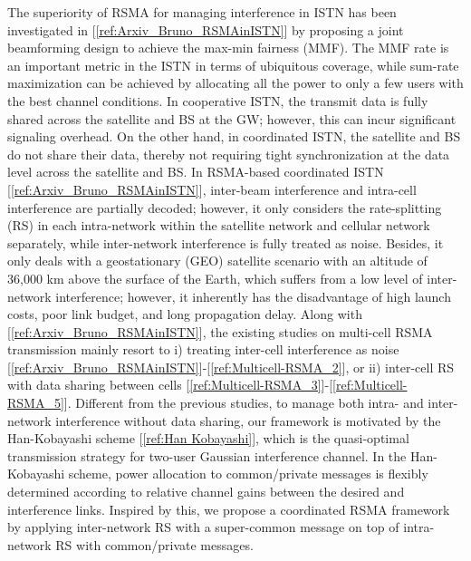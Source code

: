 \documentclass[draftclsnofoot, onecolumn, comsoc, 12pt]{IEEEtran}
\begin{document}
The superiority of RSMA for managing interference in ISTN has been investigated in [\ref{ref:Arxiv_Bruno_RSMAinISTN}] by proposing a joint beamforming design to achieve the max-min fairness (MMF).
The MMF rate is an important metric in the ISTN in terms of ubiquitous coverage, while sum-rate maximization can be achieved by allocating all the power to only a few users with the best channel conditions.
{In cooperative ISTN, the transmit data is fully shared across the satellite and BS at the GW; however, this can incur significant signaling overhead. 
On the other hand, in coordinated ISTN, the satellite and BS do not share their data, thereby not requiring tight synchronization at the data level across the satellite and BS.} 
In RSMA-based coordinated ISTN  \mbox{[\ref{ref:Arxiv_Bruno_RSMAinISTN}]}, inter-beam interference and intra-cell interference are partially decoded; 
however, it only considers the rate-splitting (RS) in each intra-network within the satellite network and cellular network separately, while inter-network interference is fully treated as noise. 
{Besides, it only deals with a geostationary (GEO) satellite scenario with an altitude of 36,000 km above the surface of the Earth, which suffers from a low level of inter-network interference; however, it inherently has the disadvantage of high launch costs, poor link budget, and long propagation delay.} 
Along with \mbox{[\ref{ref:Arxiv_Bruno_RSMAinISTN}]}, the existing studies on multi-cell RSMA transmission mainly resort to i) treating inter-cell interference as noise \mbox{[\ref{ref:Arxiv_Bruno_RSMAinISTN}]-[\ref{ref:Multicell-RSMA_2}]}, or ii) inter-cell RS with data sharing between cells \mbox{[\ref{ref:Multicell-RSMA_3}]-[\ref{ref:Multicell-RSMA_5}]}. 
Different from the previous studies, to manage both intra- and inter-network interference without data sharing, our framework is motivated by the Han-Kobayashi scheme \mbox{[\ref{ref:Han Kobayashi}]}, which is the quasi-optimal transmission strategy for two-user Gaussian interference channel. 
In the Han-Kobayashi scheme, power allocation to common/private messages is flexibly determined according to relative channel gains between the desired and interference links. 
Inspired by this, we propose a coordinated RSMA framework by applying inter-network RS with a super-common message on top of intra-network RS with common/private messages. 
\end{document}
